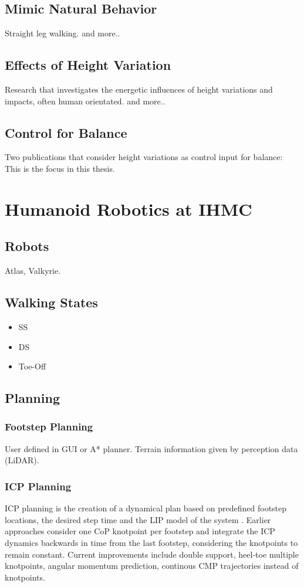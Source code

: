 \subsection{Mimic Natural Behavior}
Straight leg walking.
\cite{griffin2018straight} and more..
\subsection{Effects of Height Variation}
Research that investigates the energetic influences of height variations and impacts, often human orientated.
\cite{kuo2005energetic} \cite{lee1998determinants} \cite{gao2017increase} and more..
\subsection{Control for Balance}
Two publications that consider height variations as control input for balance:
\cite{koolen2016balance} \cite{caron2018capturability}
This is the focus in this thesis.

\section{Humanoid Robotics at IHMC}
\subsection{Robots}
Atlas, Valkyrie.
\subsection{Walking States}
\begin{itemize}
	\item \ac{SS}
	\item \ac{DS}
	\item Toe-Off
\end{itemize}
\subsection{Planning}
\subsubsection{Footstep Planning}
User defined in \ac{GUI} or A* planner. Terrain information given by perception data (LiDAR).
\subsubsection{ICP Planning}
\ac{ICP} planning is the creation of a dynamical plan based on predefined footstep locations, the desired step time and the \ac{LIP} model of the system . Earlier approaches consider one \ac{CoP} knotpoint per footstep and integrate the \ac{ICP} dynamics backwards in time from the last footstep, considering the knotpoints to remain constant. Current improvements include double support, heel-toe multiple knotpoints, angular momentum prediction, continous \ac{CMP} trajectories instead of knotpoints.
